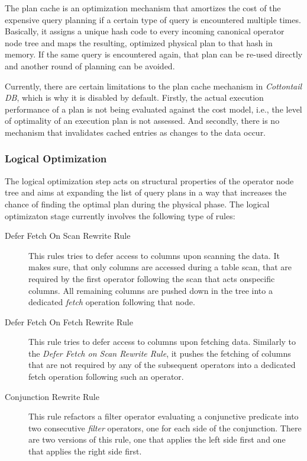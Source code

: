 The plan cache is an optimization mechanism that amortizes the cost of the expensive query planning if a certain type of query is encountered multiple times. Basically, it assigns a unique hash code to every incoming canonical operator node tree and maps the resulting, optimized physical plan to that hash in memory. If the same query is encountered again, that plan can be re-used directly and another round of planning can be avoided.

Currently, there are certain limitations to the plan cache mechanism in \emph{Cottontail DB}, which is why it is disabled by default. Firstly, the actual execution performance of a plan is not being evaluated against the cost model, i.e., the level of optimality of an execution plan is not assessed. And secondly, there is no mechanism that invalidates cached entries as changes to the data occur. 

\subsubsection{Logical Optimization}

The logical optimization step acts on structural properties of the operator node tree and aims at expanding the list of query plans in a way that increases the chance of finding the optimal plan during the physical phase. The logical optimizaton stage currently involves the following type of rules:

\begin{description}
    \item[Defer Fetch On Scan Rewrite Rule] This rules tries to defer access to columns upon scanning the data. It makes sure, that only columns are accessed during a table scan, that are required by the first operator following the scan that acts onspecific columns. All remaining columns are pushed down in the tree into a dedicated \emph{fetch} operation following that node.
 
    \item[Defer Fetch On Fetch Rewrite Rule] This rule tries to defer access to columns upon fetching data. Similarly to the \emph{Defer Fetch on Scan Rewrite Rule}, it pushes the fetching of columns that are not required by any of the subsequent operators into a dedicated fetch operation following such an operator.
    
    \item[Conjunction Rewrite Rule] This rule refactors a filter operator evaluating a conjunctive predicate into two consecutive \emph{filter} operators, one for each side of the conjunction. There are two versions of this rule, one that applies the left side first and one that applies the right side first.
\end{description}

